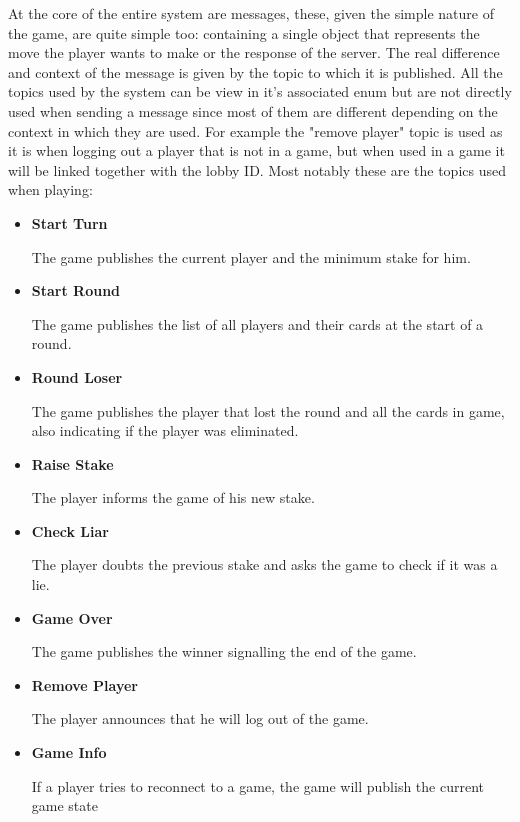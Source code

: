 \documentclass{scrartcl}
\begin{document}
At the core of the entire system are messages, these, given the simple nature of the game,
are quite simple too: containing a single object that represents the move the player wants to make or
the response of the server. \newline
The real difference and context of the message is given by the topic to which it is published. \newline
All the topics used by the system can be view in it's associated enum but are not directly
used when sending a message since most of them are different depending on the context in which they are used.
For example the "remove player" topic is used as it is when logging out a player that is not
in a game, but when used in a game it will be linked together with the lobby ID.
Most notably these are the topics used when playing:
\begin{itemize}
      \item \textbf{Start Turn} \par
            The game publishes the current player and the minimum stake for him.
      \item \textbf{Start Round} \par
            The game publishes the list of all players and their cards at the start of a round.
      \item \textbf{Round Loser} \par
            The game publishes the player that lost the round and all the cards in game,
            also indicating if the player was eliminated.
      \item \textbf{Raise Stake} \par
            The player informs the game of his new stake.
      \item \textbf{Check Liar} \par
            The player doubts the previous stake and asks the game to check if it was a lie.
      \item \textbf{Game Over} \par
            The game publishes the winner signalling the end of the game.
      \item \textbf{Remove Player} \par
            The player announces that he will log out of the game.
      \item \textbf{Game Info} \par
            If a player tries to reconnect to a game, the game will publish the current game state
\end{itemize}
\end{document}
